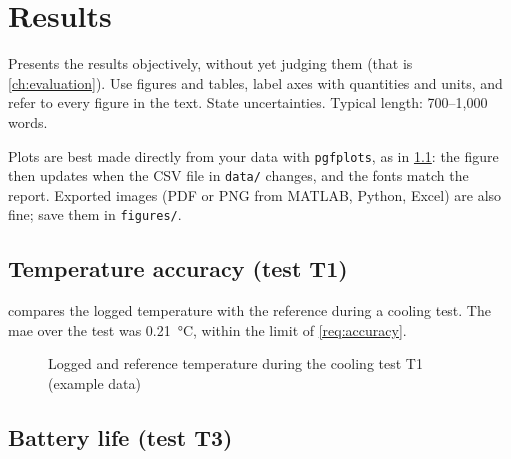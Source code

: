 \chapter{Results}
\label{ch:results}

\begin{guidance}
Presents the results objectively, without yet judging them (that is
\cref{ch:evaluation}). Use figures and tables, label axes with quantities and
units, and refer to every figure in the text. State uncertainties. Typical
length: 700--1,000 words.

Plots are best made directly from your data with \texttt{pgfplots}, as in
\cref{fig:cooling}: the figure then updates when the CSV file in
\texttt{data/} changes, and the fonts match the report. Exported images
(PDF or PNG from MATLAB, Python, Excel) are also fine; save them in
\texttt{figures/}.
\end{guidance}

\section{Temperature accuracy (test T1)}
\label{sec:res-accuracy}

 compares the logged temperature with the reference
during a cooling test. The \gls{mae} over the test was \SI{0.21}{\celsius},
within the limit of \cref{req:accuracy}.

\begin{figure}[htbp]
  \centering
  \caption{Logged and reference temperature during the cooling test T1 (example data)}
  \label{fig:cooling}
\end{figure}

\section{Battery life (test T3)}
\label{sec:res-battery}
